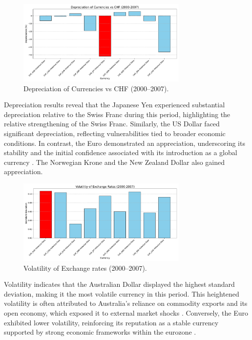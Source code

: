 \documentclass[11pt,a4paper,english,oneside]{book}
\begin{document}
\begin{figure}[h!]
    \centering
    \includegraphics[width=0.75\textwidth]{../../images/depreciation_2000_2007.pdf}
    \caption{Depreciation of Currencies vs CHF (2000--2007).}
    \label{fig:depreciation_2000_2007}
\end{figure}

Depreciation results reveal that the Japanese Yen experienced substantial depreciation relative to the Swiss Franc during this period, highlighting the relative strengthening of the Swiss Franc. Similarly, the US Dollar faced significant depreciation, reflecting vulnerabilities tied to broader economic conditions. In contrast, the Euro demonstrated an appreciation, underscoring its stability and the initial confidence associated with its introduction as a global currency \parencite{EuropeanUnion2024}. The Norwegian Krone and the New Zealand Dollar also gained appreciation.

\begin{figure}[h!]
    \centering
    \includegraphics[width=0.75\textwidth]{images/volatility_2000_2007.pdf}
    \caption{Volatility of Exchange rates (2000--2007).}
    \label{fig:volatility_2000_2007}
\end{figure}

Volatility indicates that the Australian Dollar displayed the highest standard deviation, making it the most volatile currency in this period. This heightened volatility is often attributed to Australia's reliance on commodity exports and its open economy, which exposed it to external market shocks \parencite{chen2003commodity}. Conversely, the Euro exhibited lower volatility, reinforcing its reputation as a stable currency supported by strong economic frameworks within the eurozone \parencite{juncker2015completing}.
\end{document}
